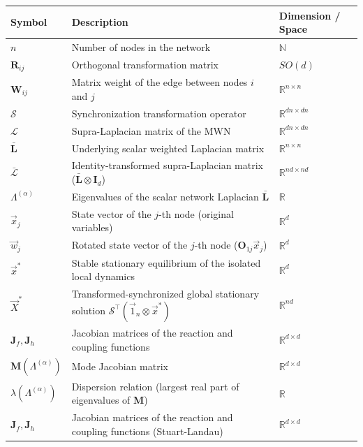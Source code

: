 \documentclass[aps,showpacs,preprintnumbers,amsmath,amssymb,twocolumn,superscriptaddress,floatfix,nofootinbib,10pt,pre]{revtex4-1}
\begin{document}
\begin{table}[ht]
\centering
\label{tab:symbols}
\begin{tabular}{lll}
\hline
\textbf{Symbol} & \textbf{Description} & \textbf{Dimension / Space} \\ \hline
$n$ & Number of nodes in the network & $\mathbb{N}$ \\
$\mathbf{R}_{ij}$ & Orthogonal transformation matrix & $SO(d)$ \\
$\mathbf{W}_{ij}$ & Matrix weight of the edge between nodes $i$ and $j$ & $\mathbb R^{n \times n}$ \\ 
$\mathcal S$ & Synchronization transformation operator & $\mathbb R^{dn\times dn}$ \\
$\mathcal L$ & Supra-Laplacian matrix of the MWN & $\mathbb R^{dn\times dn}$ \\
$\bar{\mathbf L}$ & Underlying scalar weighted Laplacian matrix & $\mathbb R^{n\times n}$ \\
$\bar{\mathcal L}$ & Identity-transformed supra-Laplacian matrix ($\bar{\mathbf L}\otimes\mathbf I_d$) & $\mathbb R^{nd\times nd}$  \\
$\Lambda^{(\alpha)}$ & Eigenvalues of the scalar network Laplacian $\bar{\mathbf L}$ & $\mathbb R$ \\
$\vec x_j$ & State vector of the $j$-th node (original variables) & $\mathbb R^d$ \\
$\vec w_j$ & Rotated state vector of the $j$-th node ($\mathbf O_{1j}\vec x_j$) & $\mathbb R^d$ \\
$\vec x^*$ & Stable stationary equilibrium of the isolated local dynamics & $\mathbb R^d$ \\
$\vec X^*$ & Transformed-synchronized global stationary solution $\mathcal S^\top(\vec{1}_n \otimes \vec{x}^*)$ & $\mathbb R^{nd}$ \\
$\mathbf{J}_{f}, \mathbf{J}_{h}$ & Jacobian matrices of the reaction and coupling functions & $\mathbb R^{d \times d}$ \\
$\mathbf M(\Lambda^{(\alpha)})$ & Mode Jacobian matrix & $\mathbb R^{d\times d}$ \\
$\lambda(\Lambda^{(\alpha)})$ & Dispersion relation (largest real part of eigenvalues of $\mathbf M$) & $\mathbb R$ \\
$\mathbf J_f, \mathbf J_h$ & Jacobian matrices of the reaction and coupling functions (Stuart-Landau) & $\mathbb R^{d \times d}$ \\

\end{tabular}
\end{table}
\end{document}

